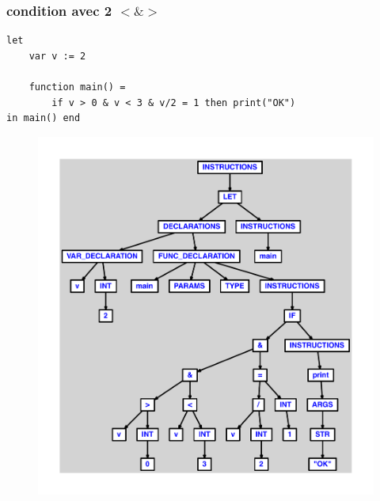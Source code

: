 \documentclass{article}
\begin{document}
\subsubsection{condition avec 2 $ < $$ \& $$ > $}
\begin{lstlisting}
let
	var v := 2

	function main() =
		if v > 0 & v < 3 & v/2 = 1 then print("OK")
in main() end
\end{lstlisting}
\newpage
\begin{figure}[H]
\centering
\includegraphics[max width=\textwidth]{ast/ast_2.pdf}
\end{figure}
\newpage
\end{document}
